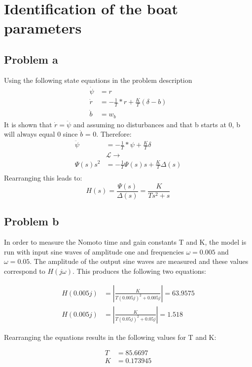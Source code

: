 \section{Identification of the boat parameters}
\subsection{Problem a}
Using the following state equations in the problem description \cite{assignment}
%
\begin{align*}
    \dot{\psi} &= r \\
    \dot{r} &= -\frac{1}{T}*r + \frac{K}{T}(\delta - b) \\
    \dot{b} &= w_b
\end{align*}
%
It is shown that $\dot{r} = \ddot{\psi}$ and assuming no disturbances and that b starts at 0, b will
always equal 0 since $\dot{b}$ = 0. Therefore:
%
\begin{align*}
    \ddot{\psi} &= -\frac{1}{T}*\psi + \frac{K}{T}\delta \\
    &\mathcal{L}\rightarrow  \\
    \Psi(s)s^2  &= -\frac{1}{T}\Psi(s)s + \frac{K}{T}\Delta(s) \\
\end{align*}
%
Rearranging this leads to:
\begin{equation}
    H(s) = \frac{\Psi(s)}{\Delta(s)} = \frac{K}{Ts^2 + s}
\end{equation}

\subsection{Problem b}
In order to measure the Nomoto time and gain constants T and K, the model is run with input sine waves
of amplitude one and frequencies $\omega = 0.005$ and $\omega = 0.05$. The amplitude of the output sine
waves are measured and these values correspond to $H(j\omega)$. This produces the following two
equations:

\begin{align*}
    H(0.005j) &= \left|\frac{K}{T(0.005j)^2 + 0.005j}\right| = 63.9575 \\
    H(0.005j) &= \left|\frac{K}{T(0.05j)^2 + 0.05j}\right| = 1.518
\end{align*}

Rearranging the equations results in the following values for T and K:

\begin{align*}
    T &= 85.6697 \\
    K &= 0.173945
\end{align*}

